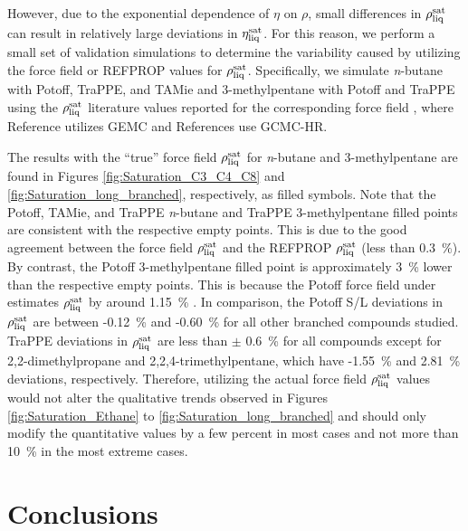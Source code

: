 \documentclass[preprint,review,12pt]{elsarticle}
\begin{document}
	However, due to the exponential dependence of $\eta$ on $\rho$, small differences in $\rho_{\rm liq}^{\rm sat}$ can result in relatively large deviations in $\eta_{\rm liq}^{\rm sat}$. For this reason, we perform a small set of validation simulations to determine the variability caused by utilizing the force field or REFPROP values for $\rho_{\rm liq}^{\rm sat}$. Specifically, we simulate \textit{n}-butane with Potoff, TraPPE, and TAMie and 3-methylpentane with Potoff and TraPPE using the $\rho_{\rm liq}^{\rm sat}$ literature values reported for the corresponding force field \cite{Martin1999,Mie,Potoff_branched,TAMie}, where Reference  utilizes GEMC and References  use GCMC-HR.      
	
	The results with the ``true'' force field $\rho_{\rm liq}^{\rm sat}$ for \textit{n}-butane and 3-methylpentane are found in Figures \ref{fig:Saturation_C3_C4_C8} and \ref{fig:Saturation_long_branched}, respectively, as filled symbols. Note that the Potoff, TAMie, and TraPPE \textit{n}-butane and TraPPE 3-methylpentane filled points are consistent with the respective empty points. This is due to the good agreement between the force field $\rho_{\rm liq}^{\rm sat}$ and the REFPROP $\rho_{\rm liq}^{\rm sat}$ (less than 0.3~\%). By contrast, the Potoff 3-methylpentane filled point is approximately 3~\% lower than the respective empty points. This is because the Potoff force field under estimates $\rho_{\rm liq}^{\rm sat}$ by around 1.15~\% \cite{Potoff_branched}. In comparison, the Potoff S/L deviations in $\rho_{\rm liq}^{\rm sat}$ are between -0.12~\% and -0.60~\% for all other branched compounds studied. TraPPE deviations in $\rho_{\rm liq}^{\rm sat}$ are less than $\pm$ 0.6~\% for all compounds except for 2,2-dimethylpropane and 2,2,4-trimethylpentane, which have -1.55~\% and 2.81~\% deviations, respectively. Therefore, utilizing the actual force field $\rho_{\rm liq}^{\rm sat}$ values would not alter the qualitative trends observed in Figures \ref{fig:Saturation_Ethane} to \ref{fig:Saturation_long_branched} and should only modify the quantitative values by a few percent in most cases and not more than 10~\% in the most extreme cases.     
	
	
	\section{Conclusions} \label{Conclusions}
	
\end{document}
